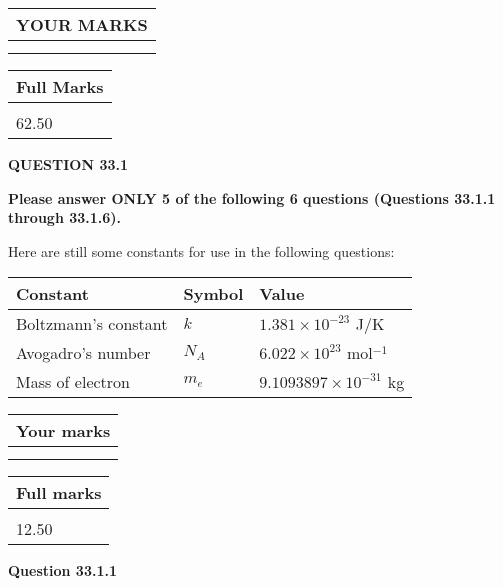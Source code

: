 \documentclass[12pt]{article}
\begin{document}
 
   
   
  
\vspace{0.2in}
  
\noindent\begin{tabular}{|l|}
\hline
 YOUR MARKS  \\
\hline
 \\ 
 \\ 
\hline
\end{tabular}
\hspace{0.05in} \begin{tabular}{|l|}
\hline
 Full Marks  \\
\hline
 \\ 
62.50 \\
\hline
\end{tabular}
{\textbf{\Large{QUESTION
33.1 
}}}
  
  
 
{\textbf{\Large{Please answer ONLY
5 of the following
6 questions (Questions
33.1.1 through
33.1.6). }}}
 
Here are still some constants for use in the following questions:
 
 
\noindent\begin{tabular}{|l|l|l|}
\hline
Constant & Symbol & Value \\
\hline
 
Boltzmann's constant &
$k$ &
 $ 1.381 \times 10^{-23} $
J/K \\
\hline
 
Avogadro's number &
$N_A$ &
 $ 6.022 \times 10^{23} $
mol$^{-1}$ \\
\hline
 
Mass of electron &
$m_e$ &
 $ 9.1093897 \times 10^{-31} $
kg \\
\hline
 
\end{tabular}
 
  
\vspace{0.2in}
  
         \begin{tabular}{|l|}
\hline
 Your marks  \\
\hline
 \\ 
 \\ 
\hline
\end{tabular}
\hspace{0.05in} \begin{tabular}{|l|}
\hline
 Full marks  \\
\hline
 \\ 
12.50 \\
\hline
\end{tabular}
{\textbf{\Large{Question
33.1.1 
}}}
  
\end{document}
